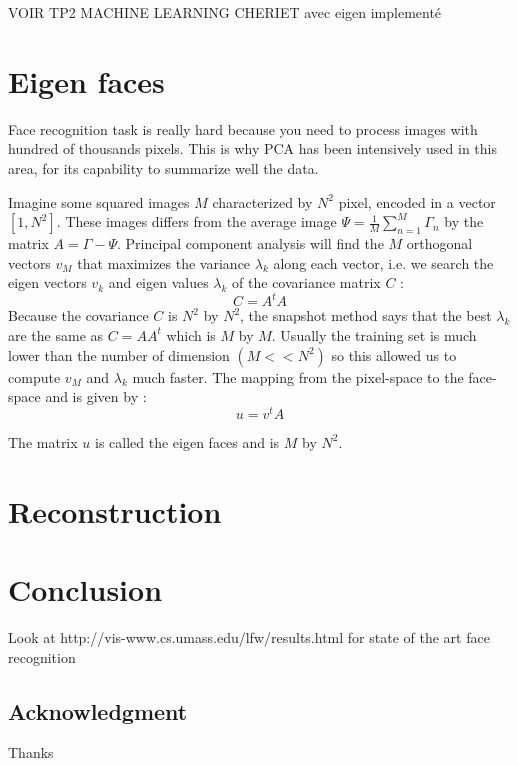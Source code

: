 \documentclass[runningheads,a4paper]{llncs}
\begin{document}
	VOIR TP2 MACHINE LEARNING CHERIET avec eigen implementé
	
	\section{Eigen faces}
	Face recognition task is really hard because you need to process images with hundred of thousands pixels. This is why
	PCA has been intensively used in this area, for its capability to summarize well the data.
	\par
	Imagine some squared images $M$ characterized by $N^2$ pixel, encoded in a vector $[1,N^2]$. These images differs from the average image $\Psi=\frac{1}{M}\sum_{n=1}^M\Gamma_n$ by the matrix $A=\Gamma-\Psi$.
	Principal component analysis will find the $M$ orthogonal vectors $v_M$ that maximizes the variance $\lambda_k$ along each vector, i.e. we search the eigen vectors $v_k$ and eigen values $\lambda_k$ of the covariance matrix $C$ :
	\begin{equation}
	C=A^tA
	\end{equation}
	Because the covariance $C$ is $N^2$ by $N^2$, the snapshot method \cite{turk1991face} says that the best $\lambda_k$ are the same as $C=AA^t$ which is $M$ by $M$. 
	Usually the training set is much lower than the number of dimension $(M<<N^2)$ so this allowed us to compute $v_M$ and $\lambda_k$ much faster. The mapping from the pixel-space to the face-space and is given by :
	\begin{equation}
	u=v^tA
	\end{equation}
	
	The matrix $u$ is called the eigen faces and is $M$ by $N^2$.
	\section{Reconstruction}
	\section{Conclusion}
	Look at http://vis-www.cs.umass.edu/lfw/results.html
	for state of the art face recognition
	\subsection*{Acknowledgment}
	Thanks
	
	{\small
		
		
	}
	
\end{document}
